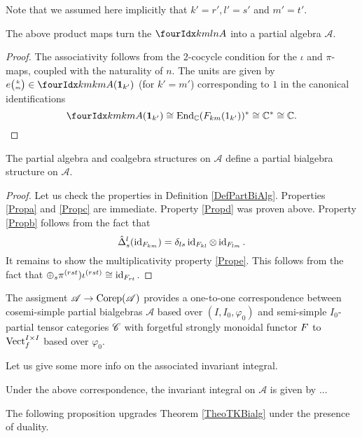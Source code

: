 Note that we assumed here implicitly that $k'=r', l'=s'$ and $m'=t'$.

\begin{Lem} The above product maps turn the $\Gr{A}{k}{l}{m}{n}$ into a partial algebra $\mathscr{A}$.
\end{Lem}
\begin{proof} The associativity follows from the 2-cocycle condition for the $\iota$ and $\pi$-maps, coupled with the naturality of $n$. The units are given by $\un{k}{m}\in \Gr{A}{k}{k}{m}{m}(\Unit_{k'})$  (for $k'=m'$) corresponding to $1$ in the canonical identifications  \[\Gr{A}{k}{k}{m}{m}(\Unit_{k'}) \cong \End_{\C}(\Forget_{km}(1_{k'}))^* \cong \C^* \cong \C.\]
\end{proof} 

\begin{Prop} The partial algebra and coalgebra structures on $\mathscr{A}$ define a partial bialgebra structure on $\mathscr{A}$. 
\end{Prop}
\begin{proof} Let us check the properties in Definition \ref{DefPartBiAlg}. Properties \ref{Propa} and \ref{Propc} are immediate. Property \ref{Propd} was proven above. Property \ref{Propb} follows from the fact that \[\hat{\Delta}^{l}_s(\operatorname{id}_{F_{km}}) = \delta_{ls} \operatorname{id}_{F_{kl}}\otimes \operatorname{id}_{F_{lm}}.\] %
It remains to show the multiplicativity property \ref{Prope}. This follows from the fact that $\oplus_s \pi^{(rst})\iota^{(rst)} \cong \operatorname{id}_{F_{rt}}$. 
\end{proof} 

\begin{Theorem}\label{TheoTKBialg} The assigment $\mathscr{A}\rightarrow \mathrm{Corep}(\mathscr{A})$ provides a one-to-one correspondence between cosemi-simple partial bialgebras $\mathscr{A}$ based over $(I,I_0,\varphi_0)$ %
and semi-simple $I_0$-partial tensor categories $\mathscr{C}$ with forgetful strongly monoidal functor $F$ to $\mathrm{Vect}_f^{I\times I}$ based over $\varphi_0$. %
\end{Theorem}

Let us give some more info on the associated invariant integral.

\begin{Lem} Under the above correspondence, the invariant integral on $\mathscr{A}$ is given by ...

\end{Lem}

The following proposition upgrades Theorem \ref{TheoTKBialg} under the presence of duality.

